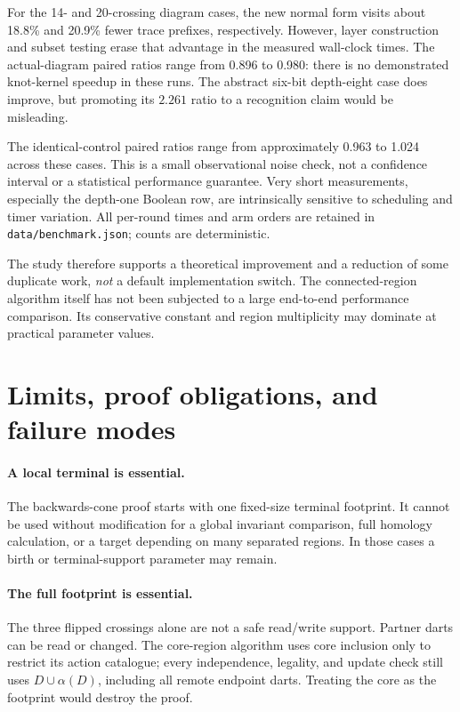 \documentclass[11pt]{article}
\theoremstyle{definition}
\newcommand{\code}[1]{\texttt{#1}}
\begin{document}
For the 14- and 20-crossing diagram cases, the new normal form visits about
18.8\% and 20.9\% fewer trace prefixes, respectively. However, layer
construction and subset testing erase that advantage in the measured
wall-clock times. The actual-diagram paired ratios range from 0.896 to
0.980: there is no demonstrated knot-kernel speedup in these runs. The
abstract six-bit depth-eight case does improve, but promoting its
$2.261$ ratio to a recognition claim would be misleading.

The identical-control paired ratios range from approximately 0.963 to
1.024 across these cases. This is a small observational noise check, not
a confidence interval or a statistical performance guarantee. Very short
measurements, especially the depth-one Boolean row, are intrinsically
sensitive to scheduling and timer variation. All per-round times and arm
orders are retained in \code{data/benchmark.json}; counts are deterministic.

The study therefore supports a theoretical improvement and a reduction
of some duplicate work, \emph{not} a default implementation switch. The
connected-region algorithm itself has not been subjected to a large
end-to-end performance comparison. Its conservative constant and region
multiplicity may dominate at practical parameter values.

\section{Limits, proof obligations, and failure modes}
\label{sec:limits}

\paragraph{A local terminal is essential.}
The backwards-cone proof starts with one fixed-size terminal footprint.
It cannot be used without modification for a global invariant comparison,
full homology calculation, or a target depending on many separated
regions. In those cases a birth or terminal-support parameter may remain.

\paragraph{The full footprint is essential.}
The three flipped crossings alone are not a safe read/write support.
Partner darts can be read or changed. The core-region algorithm uses
core inclusion only to restrict its action catalogue; every independence,
legality, and update check still uses $D\cup\alpha(D)$, including all
remote endpoint darts. Treating the core as the footprint would destroy
the proof.
\end{document}

